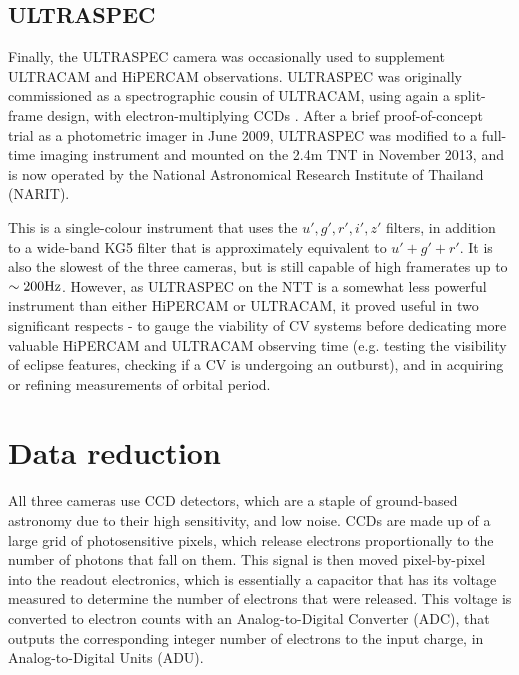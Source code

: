\subsection{ULTRASPEC}
\label{sect:observations:ultraspec}

Finally, the ULTRASPEC camera was occasionally used to supplement ULTRACAM and HiPERCAM observations. ULTRASPEC was originally commissioned as a spectrographic cousin of ULTRACAM, using again a split-frame design, with electron-multiplying CCDs \citep{dhillon2014}.
After a brief proof-of-concept trial as a photometric imager in June 2009, ULTRASPEC was modified to a full-time imaging instrument and mounted on the 2.4m TNT in November 2013, and is now operated by the National Astronomical Research Institute of Thailand (NARIT).

This is a single-colour instrument that uses the $u',g',r',i',z'$ filters, in addition to a wide-band KG5 filter that is approximately equivalent to $u' + g' + r'$. It is also the slowest of the three cameras, but is still capable of high framerates up to $\sim 200 \rm Hz$. However, as ULTRASPEC on the NTT is a somewhat less powerful instrument than either HiPERCAM or ULTRACAM, it proved useful in two significant respects - to gauge the viability of CV systems before dedicating more valuable HiPERCAM and ULTRACAM observing time (e.g. testing the visibility of eclipse features, checking if a CV is undergoing an outburst), and in acquiring or refining measurements of orbital period.


\section{Data reduction}
\label{sect:observations:data reduction}

All three cameras use CCD detectors, which are a staple of ground-based astronomy due to their high sensitivity, and low noise.
CCDs are made up of a large grid of photosensitive pixels, which release electrons proportionally to the number of photons that fall on them. This signal is then moved pixel-by-pixel into the readout electronics, which is essentially a capacitor that has its voltage measured to determine the number of electrons that were released. This voltage is converted to electron counts with an Analog-to-Digital Converter (ADC), that outputs the corresponding integer number of electrons to the input charge, in Analog-to-Digital Units (ADU).

